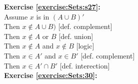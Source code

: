 \noindent\textbf{Exercise \ref{exercise:Sets:s27}:}\\ %
Assume $x$ is in $(A\cup B)'$\\
Then $x \notin A \cup B)$ [def. complement]\\
Then $x \notin A$ or $B$ [def. union]\\
Then $x \notin A$ and $x \notin B$ [logic]\\
Then $x \in A'$ and $x \in B'$ [def. complement]\\
Then $x \in A' \cap B'$ [def. interection]\\

\noindent\textbf{Exercise \ref{exercise:Sets:30}:}%


